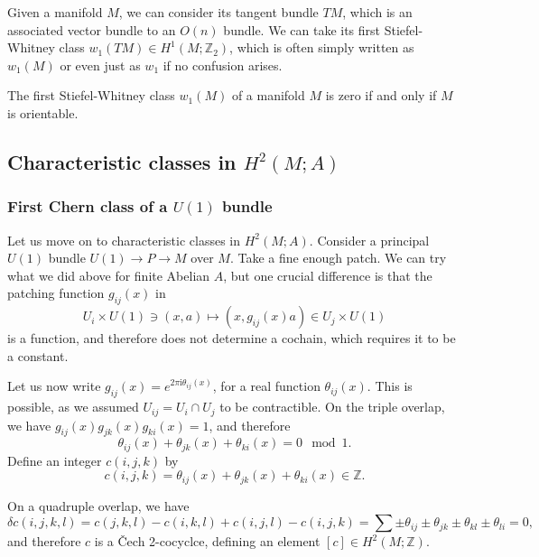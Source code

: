 \documentclass[12pt]{article}
\numberwithin{equation}{section}
\numberwithin{figure}{section}
\theoremstyle{remark}
\def\bZ{\mathbb{Z}}
\def\I{\mathrm{i}}
\begin{document}
Given a manifold $M$, we can consider its tangent bundle $TM$, which is an associated vector bundle to an $O(n)$ bundle.
We can take its first Stiefel-Whitney class $w_1(TM)\in H^1(M;\bZ_2)$,
which is often simply written as $w_1(M)$ or even just as $w_1$ 
if no confusion arises.

\begin{proposition}
  The first Stiefel-Whitney class $w_1(M)$ of a manifold $M$ is zero if and only if $M$ is orientable.
\end{proposition}

\subsection{Characteristic classes in $H^2(M;A)$}

\subsubsection{First Chern class of a $U(1)$ bundle}

Let us move on to characteristic classes in $H^2(M;A)$.
Consider a principal $U(1)$ bundle $U(1)\to P\to M$ over $M$.
Take a fine enough patch.
We can try what we did above for finite Abelian $A$,
but one crucial difference is that the patching function $g_{ij}(x)$ in \begin{equation}
  U_i\times U(1)\ni (x,a) \mapsto (x,g_{ij}(x)a)\in U_j\times U(1)
\end{equation} is a function,
and therefore does not determine a cochain,
which requires it to be a constant.

Let us now write $g_{ij}(x)=e^{2\pi\I\theta_{ij}(x)}$, for a real function $\theta_{ij}(x)$.
This is possible, as we assumed $U_{ij}=U_i\cap U_j$ to be contractible.
On the triple overlap, we have $g_{ij}(x)g_{jk}(x)g_{ki}(x)=1$, and therefore \begin{equation}
\theta_{ij}(x)+\theta_{jk}(x)+\theta_{ki}(x) = 0 \mod 1.
\end{equation} Define an integer $c(i,j,k)$ by \begin{equation}
c(i,j,k) = \theta_{ij}(x)+\theta_{jk}(x)+\theta_{ki}(x) \in \bZ.
\end{equation}

On a quadruple overlap, we have \begin{equation}
  \delta c(i,j,k,l) = c(j,k,l) - c(i,k,l) + c(i,j,l) - c(i,j,k) 
  = \sum \pm \theta_{ij} \pm \theta_{jk} \pm \theta_{kl} \pm \theta_{li} = 0 ,
\end{equation}
and therefore $c$ is a \v Cech 2-cocyclce, defining an element $[c]\in H^2(M;\bZ)$.
\end{document}
